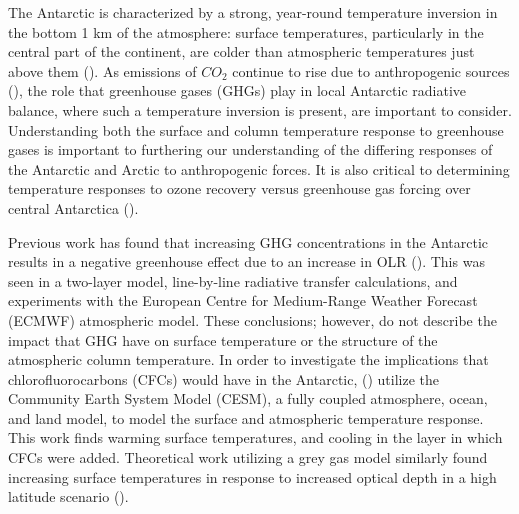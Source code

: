 \documentclass[draft]{agujournal2019}
\begin{document}
The Antarctic is characterized by a strong, year-round temperature inversion in the bottom 1 km of the atmosphere: surface temperatures, particularly in the central part of the continent, are colder than atmospheric temperatures just above them (\cite{hudson_look_2005}). As emissions of $CO_2$ continue to rise due to anthropogenic sources (\cite{peters_carbon_2020}), the role that greenhouse gases (GHGs) play in local Antarctic radiative balance, where such a temperature inversion is present, are important to consider. Understanding both the surface and column temperature response to greenhouse gases is important to furthering our understanding of the differing responses of the Antarctic and Arctic to anthropogenic forces. It is also critical to determining temperature responses to ozone recovery versus greenhouse gas forcing over central Antarctica (\cite{shindell_southern_2004}).

Previous work has found that increasing GHG concentrations in the Antarctic results in a negative greenhouse effect due to an increase in OLR (\cite{schmithusen_how_2015}). This was seen in a two-layer model, line-by-line radiative transfer calculations, and experiments with the European Centre for Medium-Range Weather Forecast (ECMWF) atmospheric model. These conclusions; however, do not describe the impact that GHG have on surface temperature or the structure of the atmospheric column temperature. In order to investigate the implications that chlorofluorocarbons (CFCs) would have in the Antarctic, (\cite{flanner_climate_2018}) utilize the Community Earth System Model (CESM), a fully coupled atmosphere, ocean, and land model, to model the surface and atmospheric temperature response. This work finds warming surface temperatures, and cooling in the layer in which CFCs were added. Theoretical work utilizing a grey gas model similarly found increasing surface temperatures in response to increased optical depth in a high latitude scenario (\cite{payne_conceptual_2015}).
\end{document}
